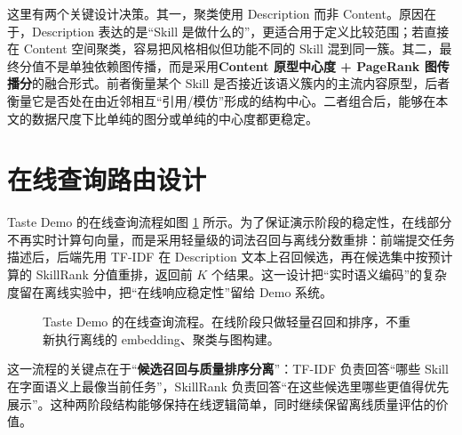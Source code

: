 这里有两个关键设计决策。其一，聚类使用 Description 而非 Content。原因在于，Description 表达的是“Skill 是做什么的”，更适合用于定义比较范围；若直接在 Content 空间聚类，容易把风格相似但功能不同的 Skill 混到同一簇。其二，最终分值不是单独依赖图传播，而是采用\textbf{Content 原型中心度 + PageRank 图传播分}的融合形式。前者衡量某个 Skill 是否接近该语义簇内的主流内容原型，后者衡量它是否处在由近邻相互“引用/模仿”形成的结构中心。二者组合后，能够在本文的数据尺度下比单纯的图分或单纯的中心度都更稳定。

\section{在线查询路由设计}
\label{sec:query_routing}

Taste Demo 的在线查询流程如图 \ref{fig:query_flow} 所示。为了保证演示阶段的稳定性，在线部分不再实时计算句向量，而是采用轻量级的词法召回与离线分数重排：前端提交任务描述后，后端先用 TF-IDF 在 Description 文本上召回候选，再在候选集中按预计算的 SkillRank 分值重排，返回前 $K$ 个结果。这一设计把“实时语义编码”的复杂度留在离线实验中，把“在线响应稳定性”留给 Demo 系统。

\begin{figure}[htbp]
\centering
{}
\caption{Taste Demo 的在线查询流程。在线阶段只做轻量召回和排序，不重新执行离线的 embedding、聚类与图构建。}
\label{fig:query_flow}
\end{figure}

这一流程的关键点在于“\textbf{候选召回与质量排序分离}”：TF-IDF 负责回答“哪些 Skill 在字面语义上最像当前任务”，SkillRank 负责回答“在这些候选里哪些更值得优先展示”。这种两阶段结构能够保持在线逻辑简单，同时继续保留离线质量评估的价值。

